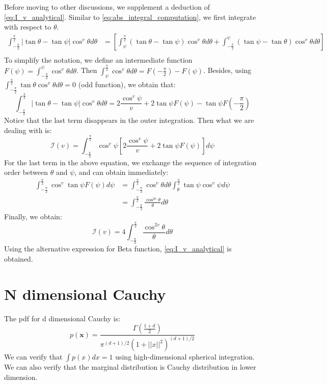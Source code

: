 \documentclass{article}
\begin{document}
Before moving to other discussions, we supplement a deduction
of \eqref{eq:I_v_analytical}.
Similar to \eqref{eq:abs_integral_computation},
we first integrate with respect to $\theta$.
\begin{align*}
    \int_{-\frac{\pi}{2}}^{\frac{\pi}{2}}
    |\tan\theta - \tan \psi|
    \cos^v\theta
    d\theta
    &=\left[
    \int_{\psi}^{\frac{\pi}{2}}
    (\tan\theta - \tan\psi)
    \cos^v\theta
    d\theta
    +
    \int_{-\frac{\pi}{2}}^{\psi}
    (\tan\psi - \tan\theta)
    \cos^v\theta
    d\theta
    \right]\\
\end{align*}
To simplify the notation, we define an intermediate function
$F(\psi) = \int_{-\frac{\pi}{2}}^{\psi} \cos^v\theta d\theta$.
Then $ \int_{\psi}^{\frac{\pi}{2}}
\cos^v\theta d\theta
= F(-\frac{\pi}{2}) - F(\psi)$.
Besides, using
$\int_{-\frac{\pi}{2}}^{\frac{\pi}{2}}
\tan\theta \cos^v \theta d\theta= 0
$  (odd function), we obtain that:
\begin{equation*}
    \int_{-\frac{\pi}{2}}^{\frac{\pi}{2}}
    |\tan\theta - \tan \psi|
    \cos^v\theta
    d\theta = 2 \frac{\cos^v \psi}{v}
    +2\tan\psi F(\psi) - \tan \psi F(-\frac{\pi}{2})
\end{equation*}
Notice that the last term disappears in the outer integration.
Then what we are dealing with is:
\begin{equation*}
    \mathcal{I}(v)
    =\int_{-\frac{\pi}{2}}^{\frac{\pi}{2}}
    \cos^v \psi \left[ 2 \frac{\cos^v \psi}{v}
    +2\tan\psi F(\psi) \right] d\psi
\end{equation*}
For the last term in the above equation, we exchange
the sequence of integration order between $\theta$ and $\psi$,
and can obtain immediately:
\begin{align*}
    \int_{-\frac{\pi}{2}}^{\frac{\pi}{2}}
    \cos^v \tan\psi F(\psi) d\psi
    &=  \int_{-\frac{\pi}{2}}^{\frac{\pi}{2}}
    \cos^v \theta d\theta
    \int_{\theta}^{\frac{\pi}{2}}\tan \psi \cos^v \psi d\psi \\
    &=\int_{-\frac{\pi}{2}}^{\frac{\pi}{2}}
    \frac{\cos^{2v}\theta}{\theta}d\theta
\end{align*}
Finally, we obtain:
\begin{equation*}
    \mathcal{I}(v)
    =4\int_{-\frac{\pi}{2}}^{\frac{\pi}{   2}}
    \frac{\cos^{2v}\theta}{\theta}d\theta
\end{equation*}
Using the alternative expression for Beta function,
\eqref{eq:I_v_analytical} is obtained.

\section{N dimensional Cauchy}
The pdf for d dimensional Cauchy is:
\begin{equation}\label{eq:cauchy_d_dim}
    p(\bm{x}) = \frac{\Gamma(\frac{1+d}{2})}
    {\pi^{(d+1)/2} (1+||x||^2)^{(d+1)/2} }
\end{equation}
We can verify that $\int p(x)dx=1$
using high-dimensional spherical integration.
We can also verify that the marginal distribution is Cauchy
distribution in lower dimension.
\end{document}
